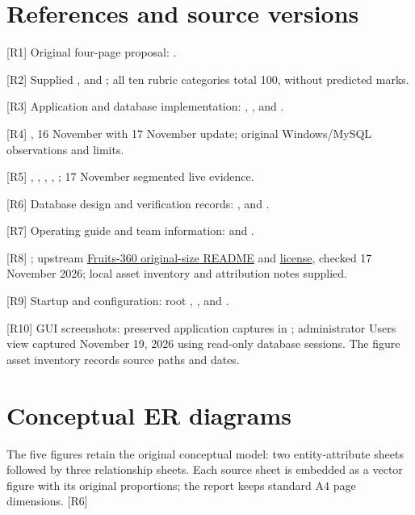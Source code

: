 \documentclass[12pt,a4paper]{report}
\begin{document}
\chapter*{References and source versions}

[R1] Original four-page proposal: .

[R2] Supplied ,  and ; all ten rubric categories total 100, without predicted marks.

[R3] Application and database implementation: , ,  and .

[R4] , 16 November with 17 November update; original Windows/\allowbreak{}MySQL observations and limits.

[R5] , , , , ; 17 November segmented live evidence.

[R6] Database design and verification records: ,  and .

[R7] Operating guide and team information:  and .

[R8] ; upstream \href{https://github.com/fruits-360/fruits-360-original-size/blob/main/README.md}{Fruits-360 original-size README} and \href{https://github.com/fruits-360/fruits-360-original-size/blob/main/LICENSE}{license}, checked 17 November 2026; local asset inventory and attribution notes supplied.


[R9] Startup and configuration: root , ,  and .


[R10] GUI screenshots: preserved application captures in ; administrator Users view captured November 19, 2026 using read-only database sessions. The figure asset inventory records source paths and dates.

\appendix
\chapter{Conceptual ER diagrams}
The five figures retain the original conceptual model: two entity-attribute sheets followed by three relationship sheets. Each source sheet is embedded as a vector figure with its original proportions; the report keeps standard A4 page dimensions. [R6]
\end{document}
